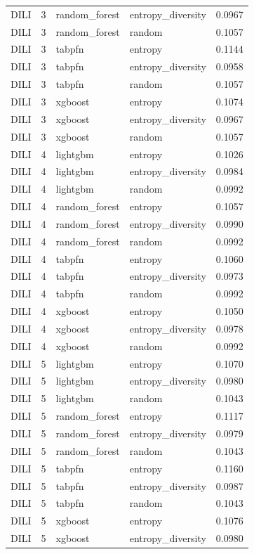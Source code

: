 \begin{tabular}{lrllr}
DILI & 3 & random_forest & entropy_diversity & 0.0967 \\
DILI & 3 & random_forest & random & 0.1057 \\
DILI & 3 & tabpfn & entropy & 0.1144 \\
DILI & 3 & tabpfn & entropy_diversity & 0.0958 \\
DILI & 3 & tabpfn & random & 0.1057 \\
DILI & 3 & xgboost & entropy & 0.1074 \\
DILI & 3 & xgboost & entropy_diversity & 0.0967 \\
DILI & 3 & xgboost & random & 0.1057 \\
DILI & 4 & lightgbm & entropy & 0.1026 \\
DILI & 4 & lightgbm & entropy_diversity & 0.0984 \\
DILI & 4 & lightgbm & random & 0.0992 \\
DILI & 4 & random_forest & entropy & 0.1057 \\
DILI & 4 & random_forest & entropy_diversity & 0.0990 \\
DILI & 4 & random_forest & random & 0.0992 \\
DILI & 4 & tabpfn & entropy & 0.1060 \\
DILI & 4 & tabpfn & entropy_diversity & 0.0973 \\
DILI & 4 & tabpfn & random & 0.0992 \\
DILI & 4 & xgboost & entropy & 0.1050 \\
DILI & 4 & xgboost & entropy_diversity & 0.0978 \\
DILI & 4 & xgboost & random & 0.0992 \\
DILI & 5 & lightgbm & entropy & 0.1070 \\
DILI & 5 & lightgbm & entropy_diversity & 0.0980 \\
DILI & 5 & lightgbm & random & 0.1043 \\
DILI & 5 & random_forest & entropy & 0.1117 \\
DILI & 5 & random_forest & entropy_diversity & 0.0979 \\
DILI & 5 & random_forest & random & 0.1043 \\
DILI & 5 & tabpfn & entropy & 0.1160 \\
DILI & 5 & tabpfn & entropy_diversity & 0.0987 \\
DILI & 5 & tabpfn & random & 0.1043 \\
DILI & 5 & xgboost & entropy & 0.1076 \\
DILI & 5 & xgboost & entropy_diversity & 0.0980 \\

\end{tabular}
